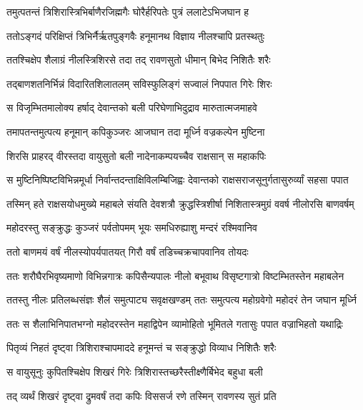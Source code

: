 \twolineshloka
{तमुत्पतन्तं त्रिशिरास्त्रिभिर्बाणैरजिह्मगैः}
{घोरैर्हरिपतेः पुत्रं ललाटेऽभिजघान ह} %

\twolineshloka
{ततोऽङ्गदं परिक्षिप्तं त्रिभिर्नैर्ऋतपुङ्गवैः}
{हनूमानथ विज्ञाय नीलश्चापि प्रतस्थतुः} %

\twolineshloka
{ततश्चिक्षेप शैलाग्रं नीलस्त्रिशिरसे तदा}
{तद् रावणसुतो धीमान् बिभेद निशितैः शरैः} %

\twolineshloka
{तद्बाणशतनिर्भिन्नं विदारितशिलातलम्}
{सविस्फुलिङ्गं सज्वालं निपपात गिरेः शिरः} %

\twolineshloka
{स विजृम्भितमालोक्य हर्षाद् देवान्तको बली}
{परिघेणाभिदुद्राव मारुतात्मजमाहवे} %

\twolineshloka
{तमापतन्तमुत्पत्य हनूमान् कपिकुञ्जरः}
{आजघान तदा मूर्ध्नि वज्रकल्पेन मुष्टिना} %

\twolineshloka
{शिरसि प्राहरद् वीरस्तदा वायुसुतो बली}
{नादेनाकम्पयच्चैव राक्षसान् स महाकपिः} %

\twolineshloka
{स मुष्टिनिष्पिष्टविभिन्नमूर्धा निर्वान्तदन्ताक्षिविलम्बिजिह्वः}
{देवान्तको राक्षसराजसूनुर्गतासुरुर्व्यां सहसा पपात} %

\twolineshloka
{तस्मिन् हते राक्षसयोधमुख्ये महाबले संयति देवशत्रौ}
{क्रुद्धस्त्रिशीर्षा निशितास्त्रमुग्रं ववर्ष नीलोरसि बाणवर्षम्} %

\twolineshloka
{महोदरस्तु सङ्क्रुद्धः कुञ्जरं पर्वतोपमम्}
{भूयः समधिरुह्याशु मन्दरं रश्मिवानिव} %

\twolineshloka
{ततो बाणमयं वर्षं नीलस्योपर्यपातयत्}
{गिरौ वर्षं तडिच्चक्रचापवानिव तोयदः} %

\twolineshloka
{ततः शरौघैरभिवृष्यमाणो विभिन्नगात्रः कपिसैन्यपालः}
{नीलो बभूवाथ विसृष्टगात्रो विष्टम्भितस्तेन महाबलेन} %

\twolineshloka
{ततस्तु नीलः प्रतिलब्धसंज्ञः शैलं समुत्पाट्य सवृक्षखण्डम्}
{ततः समुत्पत्य महोग्रवेगो महोदरं तेन जघान मूर्ध्नि} %

\twolineshloka
{ततः स शैलाभिनिपातभग्नो महोदरस्तेन महाद्विपेन}
{व्यामोहितो भूमितले गतासुः पपात वज्राभिहतो यथाद्रिः} %

\twolineshloka
{पितृव्यं निहतं दृष्ट्वा त्रिशिराश्चापमाददे}
{हनूमन्तं च सङ्क्रुद्धो विव्याध निशितैः शरैः} %

\twolineshloka
{स वायुसूनुः कुपितश्चिक्षेप शिखरं गिरेः}
{त्रिशिरास्तच्छरैस्तीक्ष्णैर्बिभेद बहुधा बली} %

\twolineshloka
{तद् व्यर्थं शिखरं दृष्ट्वा द्रुमवर्षं तदा कपिः}
{विससर्ज रणे तस्मिन् रावणस्य सुतं प्रति} %

